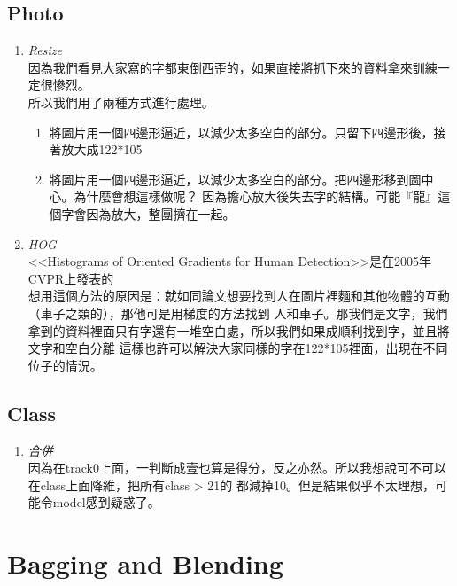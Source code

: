 \documentclass[12pt]{article}
\theoremstyle{definition}
\theoremstyle{remark}
\begin{document}
  \subsection{Photo}
    \begin{enumerate}
      \item \large{\em \color{red}Resize\/}\\
        因為我們看見大家寫的字都東倒西歪的，如果直接將抓下來的資料拿來訓練一定很慘烈。\\
        所以我們用了兩種方式進行處理。
        \begin{enumerate}
          \item 將圖片用一個四邊形逼近，以減少太多空白的部分。只留下四邊形後，接著放大成122*105
          \item 將圖片用一個四邊形逼近，以減少太多空白的部分。把四邊形移到圖中心。為什麼會想這樣做呢？
            因為擔心放大後失去字的結構。可能『龍』這個字會因為放大，整團擠在一起。
        \end{enumerate}
      \item \large{\em \color{red}HOG\/}\\
        <<Histograms of Oriented Gradients for Human Detection>>是在2005年CVPR上發表的\\
        想用這個方法的原因是：就如同論文想要找到人在圖片裡麵和其他物體的互動（車子之類的），那他可是用梯度的方法找到
        人和車子。那我們是文字，我們拿到的資料裡面只有字還有一堆空白處，所以我們如果成順利找到字，並且將文字和空白分離
        這樣也許可以解決大家同樣的字在122*105裡面，出現在不同位子的情況。
    \end{enumerate}
  \subsection{Class}
    \begin{enumerate}
      \item \large{\em \color{red}合併\/}\\
        因為在track0上面，一判斷成壹也算是得分，反之亦然。所以我想說可不可以在class上面降維，把所有class > 21的
        都減掉10。但是結果似乎不太理想，可能令model感到疑惑了。
    \end{enumerate}
\section{Bagging and Blending}
\end{document}
